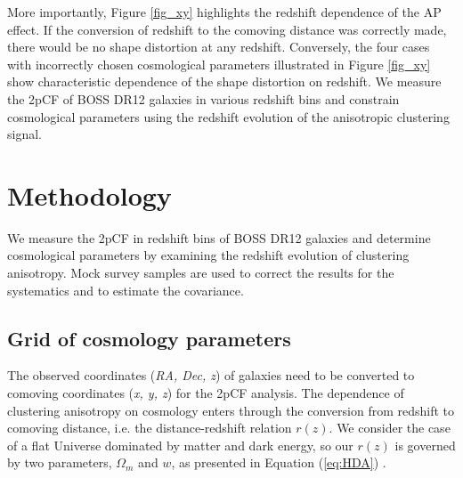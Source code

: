 \documentclass[iop]{emulateapj}
\begin{document}
More importantly, Figure \ref{fig_xy} highlights the redshift dependence of the AP effect. 
If the conversion of redshift to the comoving distance was correctly made,
there would be no shape distortion at any redshift.
Conversely, the four cases with incorrectly chosen cosmological parameters illustrated 
in Figure \ref{fig_xy} 
show characteristic dependence of the shape distortion on redshift.
We measure the 2pCF of BOSS DR12 galaxies in various redshift bins
and constrain cosmological parameters using the redshift evolution
of the anisotropic clustering signal.



\section{Methodology}\label{sec:methodology}

We measure the 2pCF in redshift bins of BOSS DR12 galaxies and 
determine cosmological parameters by examining the redshift evolution of clustering anisotropy.
Mock survey samples are used to correct the results for the systematics and to estimate the covariance.

\subsection{Grid of cosmology parameters}

The observed coordinates ({\it RA, Dec, z}) of galaxies
need to be converted to comoving coordinates ({\it x, y, z}) for the 2pCF analysis.
The dependence of clustering anisotropy on cosmology enters through the conversion from redshift to comoving distance,
i.e. the distance-redshift relation $r(z)$.
We consider the case of a flat Universe dominated by matter and dark energy,
so our $r(z)$ is governed by two parameters, $\Omega_m$ and $w$, as presented in Equation (\ref{eq:HDA})	.
\end{document}
